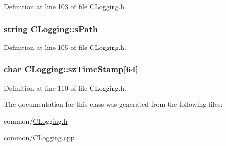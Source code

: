 \-Definition at line 103 of file \-C\-Logging.\-h.

\hypertarget{class_c_logging_a128a9f601af04f28b1934212215427f8}{
\subsubsection[{s\-Path}]{\setlength{\rightskip}{0pt plus 5cm}string {\bf \-C\-Logging\-::s\-Path}}}\label{class_c_logging_a128a9f601af04f28b1934212215427f8}


\-Definition at line 105 of file \-C\-Logging.\-h.

\hypertarget{class_c_logging_a7fa407b1c3154d7e6da724e20f54eba7}{
\subsubsection[{sz\-Time\-Stamp}]{\setlength{\rightskip}{0pt plus 5cm}char {\bf \-C\-Logging\-::sz\-Time\-Stamp}\mbox{[}64\mbox{]}}}\label{class_c_logging_a7fa407b1c3154d7e6da724e20f54eba7}


\-Definition at line 110 of file \-C\-Logging.\-h.



\-The documentation for this class was generated from the following files\-:\begin{DoxyCompactItemize}
\item 
common/\hyperlink{_c_logging_8h}{\-C\-Logging.\-h}\item 
common/\hyperlink{_c_logging_8cpp}{\-C\-Logging.\-cpp}\end{DoxyCompactItemize}
